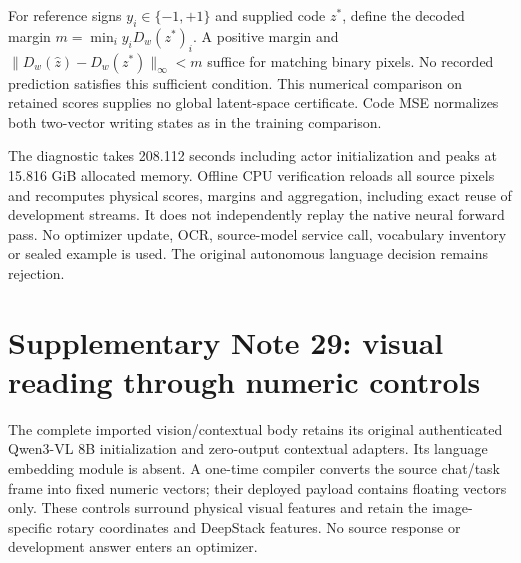 \documentclass[10pt,a4paper]{article}
\begin{document}
For reference signs $y_i\in\{-1,+1\}$ and supplied code $z^*$, define the
decoded margin $m=\min_i y_iD_w(z^*)_i$. A positive margin and
$\|D_w(\widehat z)-D_w(z^*)\|_\infty<m$ suffice for matching binary pixels.
No recorded prediction satisfies this sufficient condition. This numerical
comparison on retained scores supplies no global latent-space certificate.
Code MSE normalizes both two-vector writing states as in the training
comparison.

The diagnostic takes 208.112 seconds including actor initialization and peaks
at 15.816 GiB allocated memory. Offline CPU verification reloads all source
pixels and recomputes physical scores, margins and aggregation, including
exact reuse of development streams. It does not independently replay the
native neural forward pass. No optimizer update, OCR, source-model service
call, vocabulary inventory or sealed example is used. The original
autonomous language decision remains rejection.


\section*{Supplementary Note 29: visual reading through numeric controls}
The complete imported vision/contextual body retains its original
authenticated Qwen3-VL 8B initialization and zero-output contextual adapters.
Its language embedding module is absent. A one-time compiler converts the
source chat/task frame into fixed numeric vectors; their deployed payload
contains floating vectors only. These controls surround physical visual
features and retain the image-specific rotary coordinates and DeepStack
features. No source response or development answer enters an optimizer.
\end{document}
